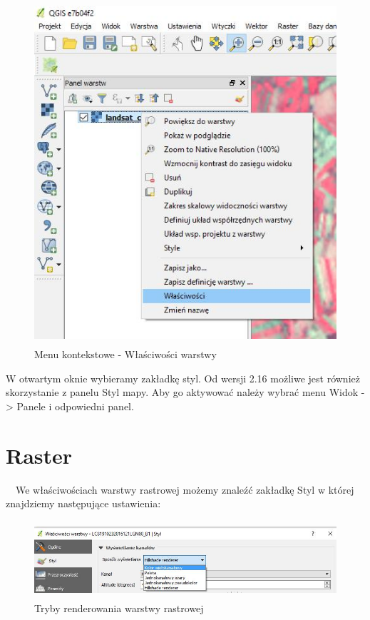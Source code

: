 \documentclass[12pt,a4paper]{book}
\begin{document}
\begin{center}
\begin{figure}
\includegraphics[width=11.596cm,height=12.771cm]{007-kontekstowe.jpg}
\caption{Menu kontekstowe - Właściwości warstwy}
\end{figure}
\end{center}
W otwartym oknie wybieramy zakładkę styl. Od wersji 2.16 możliwe jest również skorzystanie z panelu Styl mapy. Aby go aktywować należy wybrać menu  Widok -{\textgreater} Panele  i odpowiedni panel.

\section{Raster}
\ \ We właściwościach warstwy rastrowej możemy znaleźć zakładkę Styl w której znajdziemy następujące ustawienia:



\begin{center}
\begin{figure}
\includegraphics[width=13cm,height=2.868cm]{007-raster-tryby.jpg}
\caption{Tryby renderowania warstwy rastrowej}
\end{figure}
\end{center}
\end{document}
